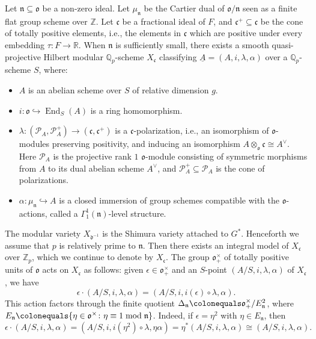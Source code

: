 \documentclass[11pt]{amsart}
\theoremstyle{definition} %
\theoremstyle{plain} %
\theoremstyle{remark} %
\newcommand{\QQ}{{\mathbb Q}}
\newcommand{\RR}{{\mathbb R}}
\newcommand{\ZZ}{{\mathbb Z}}
\newcommand{\cP}{{\mathcal P}}
\newcommand{\frakc}{\mathfrak c}
\newcommand{\frakd}{\mathfrak d}
\newcommand{\frakn}{\mathfrak n}
\newcommand{\frako}{\mathfrak o}
\newcommand{\defeq}{\colonequals} %
\newcommand{\isom}{\cong} %
\DeclareMathOperator\End{End} %
\begin{document}
Let $\frakn\subseteq \frako$ be a non-zero ideal.
Let $\mu_\frakn$ be the Cartier dual of 
$\frako/\frakn$ seen as a finite flat group scheme over $\ZZ$. Let $\frakc$ be a fractional ideal of $F$, and $\frakc^+\subseteq\frakc$ be the cone of totally positive elements, i.e., the elements in $\frakc$ which are positive under every embedding $\tau\colon F\rightarrow \RR$.
When $\frakn$ is sufficiently small, there exists a smooth quasi-projective Hilbert modular $\QQ_p$-scheme $X_\frakc$ classifying $\underline{A} = (A,i,\lambda,\alpha)$ 
over a $\QQ_p$-scheme $S$, where: 
\begin{itemize}
    \item $A$ is an abelian scheme over $S$ of relative dimension $g$.
    \item $i\colon \frako \hookrightarrow \End_S(A)$ is a ring homomorphism.
    \item $\lambda\colon (\cP_A, \cP_A^+) \rightarrow (\frakc,\frakc^+)$ is  a $\frakc$-polarization, i.e.,  an isomorphism of $\frako$-modules preserving positivity, and inducing an isomorphism $A\otimes_{\frako} \frakc \isom A^\vee$.
    Here $\cP_A$ is the projective rank $1$ $\frako$-module  consisting of symmetric morphisms from $A$ to its dual abelian scheme $A^\vee$, and $\cP_A^+\subseteq \cP_A$ is the cone of polarizations.
    \item $\alpha\colon \mu_\frakn  \hookrightarrow A$ is a closed immersion of group schemes compatible with the $\frako$-actions,  called a $\Gamma_1^1(\frakn)$-level structure. 
\end{itemize} 
The modular variety $X_{\frakd^{-1}}$ is the Shimura variety attached to $G^\ast$.
Henceforth we  assume that $p$ is relatively prime to $\frakn$.
Then there exists an integral model of $X_\frakc$ over $\ZZ_p$, which we continue to denote by $X_\frakc$.
The group  $\frako_{+}^\times$ of totally positive units of $\frako$ acts  on $X_\frakc$ as follows: given $\epsilon\in\frako_{+}^\times$ and an $S$-point $(A/S, i, \lambda, \alpha)$ of $X_\frakc$, we have
\[
 \epsilon\cdot (A/S,i,\lambda,\alpha) = (A/S, i, i(\epsilon)\circ\lambda,\alpha).
\]
This action  factors through the finite quotient $\Delta_\frakn\defeq \frako_{+}^\times/E_\frakn^2$, where $E_\frakn\defeq\{\eta\in\frako^\times\colon\eta\equiv 1\bmod\frakn\}$.
Indeed, if $\epsilon = \eta^2$ with $\eta \in E_\frakn$, then
\[
\epsilon\cdot (A/S,i,\lambda,\alpha)
=(A/S,i,i(\eta^2)\circ\lambda,\eta\alpha)
=\eta^\ast(A/S,i,\lambda,\alpha)
\isom (A/S,i,\lambda,\alpha).
\]
\end{document}
